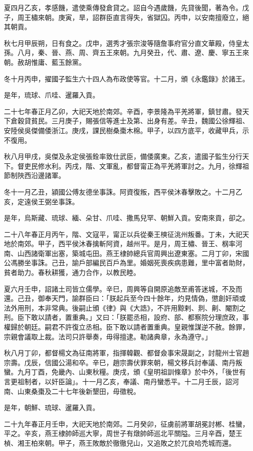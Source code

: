 \begin{pinyinscope}
夏四月乙亥，孝感饑，遣使乘傳發倉貸之。詔自今遇歲饑，先貸後聞，著為令。戊子，周王橚來朝。庚寅，旱，詔群臣直言得失，省獄囚。丙申，以安南擅廢立，絕其朝貢。

秋七月甲辰朔，日有食之。戊申，選秀才張宗浚等隨詹事府官分直文華殿，侍皇太孫。八月，秦、晉、燕、周、齊五王來朝。九月癸丑，代、肅、遼、慶、寧五王來朝。赦胡惟庸、藍玉餘黨。

冬十月丙申，擢國子監生六十四人為布政使等官。十二月，頒《永鑑錄》於諸王。

是年，琉球、爪哇、暹羅入貢。

二十七年春正月乙卯，大祀天地於南郊。辛酉，李景隆為平羌將軍，鎮甘肅。發天下倉穀貸貧民。三月庚子，賜張信等進士及第、出身有差。辛丑，魏國公徐輝祖、安陸侯吳傑備倭浙江。庚戌，課民樹桑棗木棉。甲子，以四方底平，收藏甲兵，示不復用。

秋八月甲戌，吳傑及永定侯張銓率致仕武臣，備倭廣東。乙亥，遣國子監生分行天下。督吏民修水利。丙戌，階、文軍亂，都督甯正為平羌將軍討之。九月，徐輝祖節制陜西沿邊諸軍。

冬十一月乙丑，潁國公傅友德坐事誅。阿資復叛，西平侯沐春擊敗之。十二月乙亥，定遠侯王弼坐事誅。

是年，烏斯藏、琉球、緬、朵甘、爪哇、撒馬兒罕、朝鮮入貢。安南來貢，卻之。

二十八年春正月丙午，階、文寇平，甯正以兵從秦王樉征洮州叛番。丁未，大祀天地於南郊。甲子，西平侯沐春擒斬阿資，越州平。是月，周王橚、晉王、㭎率河南、山西諸衛軍出塞，築城屯田。燕王棣帥總兵官周興出遼東塞。二月丁卯，宋國公馮勝坐事誅。己丑，諭戶部編民百戶為里。婚姻死喪疾病患難，里中富者助財，貧者助力。春秋耕獲，通力合作，以教民睦。

夏六月壬申，詔諸土司皆立儒學。辛巳，周興等自開原追敵至甫答迷城，不及而還。己丑，御奉天門，諭群臣曰：「朕起兵至今四十餘年，灼見情偽，懲創奸頑或法外用刑，本非常典。後嗣止頒《律》與《大誥》，不許用黥剌、剕、劓、閹割之刑。臣下敢以請者，置重典。」又曰：「朕罷丞相，設府、部、都察院分理庶政，事權歸於朝廷。嗣君不許復立丞相。臣下敢以請者置重典。皇親惟謀逆不赦。餘罪，宗親會議取上裁。法司只許舉奏，毋得擅逮。勒諸典章，永為遵守。」

秋八月丁卯，都督楊文為征南將軍，指揮韓觀、都督僉事宋晟副之，討龍州士官趙宗壽。戊辰，信國公湯和卒。辛巳，趙宗壽伏罪來朝，楊文移兵討奉議、南丹叛蠻。九月丁酉，免畿內、山東秋糧。庚戌，頒《皇明祖訓條章》於中外，「後世有言更祖制者，以奸臣論」。十一月乙亥，奉議、南丹蠻悉平。十二月壬辰，詔河南、山東桑棗及二十七年後新墾田，毋徵稅。

是年，朝鮮、琉球、暹羅入貢。

二十九年春正月壬申，大祀天地於南郊。二月癸卯，征虜前將軍胡冕討郴、桂蠻，平之。辛亥，燕王棣帥師巡大寧，周世子有燉帥師巡北平關隘。三月辛酉，楚王楨、湘王柏來朝。甲子，燕王敗敵於徹徹兒山，又追敗之於兀良哈禿城而還。


\end{pinyinscope}
